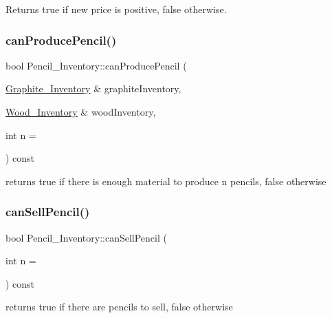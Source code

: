 \begin{DoxyReturn}{Returns}
true if new price is positive, false otherwise. 
\end{DoxyReturn}
\mbox{\label{classPencil__Inventory_a9026f7bf1a45e41aebea2e39f6edfdff}} 
\subsubsection{\texorpdfstring{can\+Produce\+Pencil()}{canProducePencil()}}
{\footnotesize\ttfamily bool Pencil\+\_\+\+Inventory\+::can\+Produce\+Pencil (\begin{DoxyParamCaption}\item[{\hyperlink{classGraphite__Inventory}{Graphite\+\_\+\+Inventory} \&}]{graphite\+Inventory,  }\item[{\hyperlink{classWood__Inventory}{Wood\+\_\+\+Inventory} \&}]{wood\+Inventory,  }\item[{int}]{n = {} }\end{DoxyParamCaption}) const}



returns true if there is enough material to produce n pencils, false otherwise 

\mbox{\label{classPencil__Inventory_ab8c12609e21dfd98269e6d4589b13a1c}} 
\subsubsection{\texorpdfstring{can\+Sell\+Pencil()}{canSellPencil()}}
{\footnotesize\ttfamily bool Pencil\+\_\+\+Inventory\+::can\+Sell\+Pencil (\begin{DoxyParamCaption}\item[{int}]{n = {} }\end{DoxyParamCaption}) const}



returns true if there are pencils to sell, false otherwise 

\mbox{\label{classPencil__Inventory_a711d64e733cd5b67ea3aeb0ccdda0870}} 
